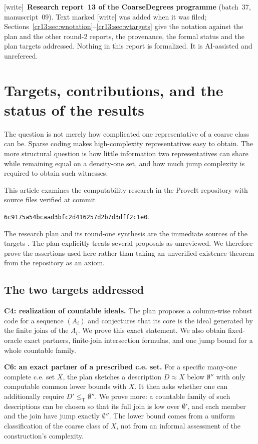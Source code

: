 \documentclass[11pt,letterpaper]{article}
\theoremstyle{definition}
\theoremstyle{remark}\newtheorem{remark}[theorem]{Remark}
\numberwithin{equation}{section}
\newcommand{\leT}{\leq_{\mathrm T}}
\newcommand{\snapshot}{\texttt{6c9175a54bcaad3bfc2d416257d2b7d3dff2c1e0}}
\newcommand{\wtag}{\textup{[write]}}
\begin{document}
\medskip
{\small\noindent
\wtag\ \textbf{Research report~13 of the CoarseDegrees programme} (batch~37, manuscript~09). Text marked \wtag{} was added when it was filed; Sections~\ref{cr13:sec:wnotation}--\ref{cr13:sec:wtargets} give the notation against the plan and the other round-2 reports, the provenance, the formal status and the plan targets addressed. Nothing in this report is formalized. It is AI-assisted and unrefereed.\par}
\newpage

\section{Targets, contributions, and the status of the results}
\label{cr13:sec:scope}
The question is not merely how complicated one representative of a coarse class can be. Sparse coding makes high-complexity representatives easy to obtain. The more structural question is how little information two representatives can share while remaining equal on a density-one set, and how much jump complexity is required to obtain such witnesses.

This article examines the computability research in the ProveIt repository with source files verified at commit
\begin{center}\small\snapshot.\end{center}
The research plan and its round-one synthesis are the immediate sources of the targets \cite{Plan,Synthesis}. The plan explicitly treats several proposals as unreviewed. We therefore prove the assertions used here rather than taking an unverified existence theorem from the repository as an axiom.

\subsection{The two targets addressed}
\textbf{C4: realization of countable ideals.} The plan proposes a column-wise robust code for a sequence $(A_i)$ and conjectures that its core is the ideal generated by the finite joins of the $A_i$. We prove this exact statement. We also obtain fixed-oracle exact partners, finite-join intersection formulas, and one jump bound for a whole countable family.

\textbf{C6: an exact partner of a prescribed c.e. set.} For a specific many-one complete c.e. set $X$, the plan sketches a description $D\approx X$ below $\emptyset''$ with only computable common lower bounds with $X$. It then asks whether one can additionally require $D'\leT\emptyset''$. We prove more: a countable family of such descriptions can be chosen so that its full join is low over $\emptyset'$, and each member and the join have jump exactly $\emptyset''$. The lower bound comes from a uniform classification of the coarse class of $X$, not from an informal assessment of the construction's complexity.
\end{document}
